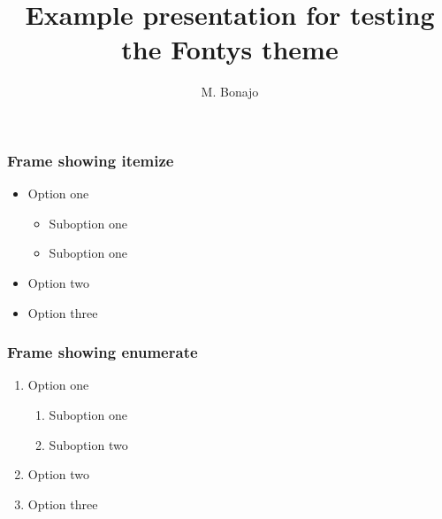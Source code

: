 \documentclass[aspectratio=169]{beamer}
\title{Example presentation for testing the Fontys theme}
\institute{FHTenL}
\author{M. Bonajo}
\begin{document}
\begin{titleframe}
    \titlepage
\end{titleframe}

\begin{frame}
    \tableofcontents
\end{frame}

\begin{frame}
    \frametitle{Frame showing itemize}

    \begin{itemize}
        \item Option one
        \begin{itemize}
            \item Suboption one
            \item Suboption one
        \end{itemize}
        \item Option two
        \item Option three
    \end{itemize}

\end{frame}

\begin{frame}
    \frametitle{Frame showing enumerate}

    \begin{enumerate}
        \item Option one
        \begin{enumerate}
            \item Suboption one
            \item Suboption two
        \end{enumerate}
        \item Option two
        \item Option three
    \end{enumerate}

\end{frame}
\end{document}
